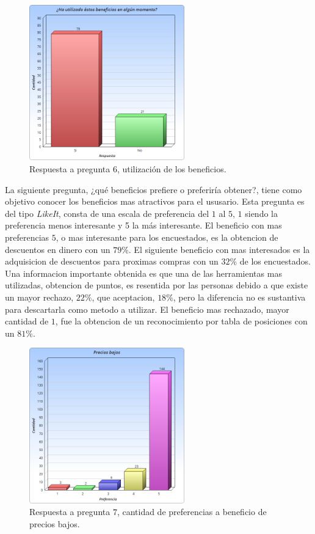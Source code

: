 \begin{figure}[!htb]
  \centering
  \includegraphics[width=0.6\textwidth]{images/Graficos/graf_5_4.png}
  \caption[chart5.4]{Respuesta a pregunta $6$, utilización de los beneficios.}
  \label{fig:chart5.4}
\end{figure}


La siguiente pregunta, ¿qué beneficios prefiere o preferiría obtener?, tiene como objetivo conocer los
 beneficios mas atractivos para el ususario. Esta pregunta es del tipo \emph{LikeIt}, consta de una 
escala de preferencia del $1$ al $5$, $1$ siendo la preferencia menos interesante y 5 la más interesante.
 El beneficio con mas preferencias $5$, o mas interesante para los encuestados, es la obtencion de
descuentos en dinero con un $79\%$. El siguiente beneficio con mas interesados es la adquisicion 
de descuentos para proximas compras con un $32\%$ de los encuestados. Una informacion importante 
obtenida es que una de las herramientas mas utilizadas, obtencion de puntos, es resentida por las
personas debido a que existe un mayor rechazo, $22\%$, que aceptacion, $18\%$, pero la diferencia 
no es sustantiva para descartarla como metodo a utilizar.
El beneficio mas rechazado, mayor cantidad de $1$, fue la obtencion de un reconocimiento por tabla
 de posiciones con un $81\%$.


\begin{figure}[!htb]
  \centering
  \includegraphics[width=0.6\textwidth]{images/Graficos/graf_5_5.png}
  \caption[chart5.5]{Respuesta a pregunta $7$, cantidad de preferencias a beneficio de precios bajos.}
  \label{fig:chart5.5}
\end{figure}

